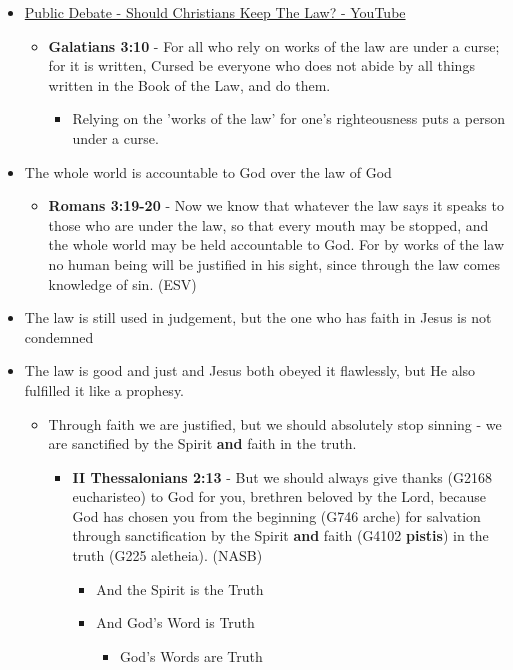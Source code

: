 \documentclass[11pt]{article}
\begin{document}
\begin{itemize}
\item \href{https://www.youtube.com/watch?v=CNHKqhwu6Bo}{Public Debate - Should Christians Keep The Law? - YouTube}
\begin{itemize}
\item \textbf{Galatians 3:10} - For all who rely on works of the law are under a curse; for it is written, Cursed be everyone who does not abide by all things written in the Book of the Law, and do them.
\begin{itemize}
\item Relying on the 'works of the law' for one's righteousness puts a person under a curse.
\end{itemize}
\end{itemize}
\item The whole world is accountable to God over the law of God
\begin{itemize}
\item \textbf{Romans 3:19-20} - Now we know that whatever the law says it speaks to those who are under the law, so that every mouth may be stopped, and the whole world may be held accountable to God. For by works of the law no human being will be justified in his sight, since through the law comes knowledge of sin. (ESV)
\end{itemize}
\item The law is still used in judgement, but the one who has faith in Jesus is not condemned
\item The law is good and just and Jesus both obeyed it flawlessly, but He also fulfilled it like a prophesy.
\begin{itemize}
\item Through faith we are justified, but we should absolutely stop sinning - we are sanctified by the Spirit \textbf{and} faith in the truth.
\begin{itemize}
\item \textbf{II Thessalonians 2:13} - But we should always give thanks (G2168 eucharisteo) to God for you, brethren beloved by the Lord, because God has chosen you from the beginning (G746 arche) for salvation through sanctification by the Spirit \textbf{and} faith (G4102 \textbf{pistis}) in the truth (G225 aletheia). (NASB)
\begin{itemize}
\item And the Spirit is the Truth
\item And God's Word is Truth
\begin{itemize}
\item God's Words are Truth

\end{itemize}
\end{itemize}
\end{itemize}
\end{itemize}
\end{itemize}
\end{document}
